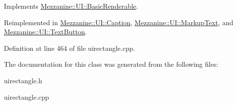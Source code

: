 Implements \hyperlink{classMezzanine_1_1UI_1_1BasicRenderable_a446b43c6dde21c7f0c021ca6833f841d}{Mezzanine::UI::BasicRenderable}.



Reimplemented in \hyperlink{classMezzanine_1_1UI_1_1Caption_ab6c528d41fb194d19b2ec426a9d95db7}{Mezzanine::UI::Caption}, \hyperlink{classMezzanine_1_1UI_1_1MarkupText_a3a7e102a8b5b3217526ce183465ed69e}{Mezzanine::UI::MarkupText}, and \hyperlink{classMezzanine_1_1UI_1_1TextButton_a06a5a6400dff268de5c91737de09fda9}{Mezzanine::UI::TextButton}.



Definition at line 464 of file uirectangle.cpp.



The documentation for this class was generated from the following files:\begin{DoxyCompactItemize}
\item 
uirectangle.h\item 
uirectangle.cpp\end{DoxyCompactItemize}

